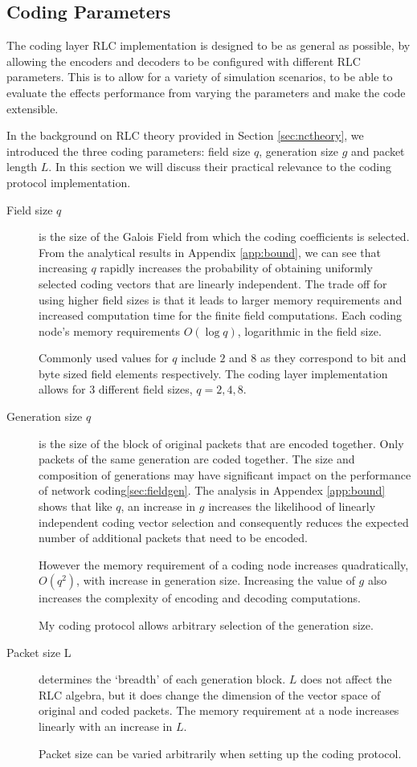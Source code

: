 \documentclass[12pt,a4paper,twoside,openright]{report}
\begin{document}
\subsection{Coding Parameters}


The coding layer RLC implementation is designed to be as general as possible, by allowing the encoders and decoders to be configured with different RLC parameters. This is to allow for a variety of simulation scenarios, to be able to evaluate the effects performance from varying the parameters and make the code extensible.

In the background on RLC theory provided in Section \ref{sec:nctheory}, we introduced the three coding parameters: field size $q$, generation size $g$ and packet length $L$. In this section we will discuss their practical relevance to the coding protocol implementation.

\begin{description}
	\item[Field size $q$] is the size of the Galois Field from which the coding coefficients is selected. From the analytical results in Appendix \ref{app:bound}, we can see that increasing $q$ rapidly increases the probability of obtaining uniformly selected coding vectors that are linearly independent. The trade off for using higher field sizes is that it leads to larger memory requirements and increased computation time for the finite field computations. Each coding node's memory requirements $O(\log q)$, logarithmic in the field size.

	  Commonly used values for $q$ include $2$ and $8$ as they correspond to bit and byte sized field elements respectively. The coding layer implementation allows for $3$ different field sizes, $q = 2, 4, 8$.
	\item[Generation size $q$] is the size of the block of original packets that are encoded together. Only packets of the same generation are coded together. The size and composition of generations may have significant impact on the performance of network coding\ref{sec:fieldgen}. The analysis in Appendex \ref{app:bound} shows that like $q$, an increase in $g$ increases the likelihood of linearly independent coding vector selection and consequently reduces the expected number of additional packets that need to be encoded. 

	However the memory requirement of a coding node increases quadratically, $O(q^2)$, with increase in generation size. Increasing the value of $g$ also increases the complexity of encoding and decoding computations. 

	My coding protocol allows arbitrary selection of the generation size. 
	\item[Packet size L] determines the `breadth' of each generation block. $L$ does not affect the RLC algebra, but it does change the dimension of the vector space of original and coded packets. The memory requirement at a node increases linearly with an increase in $L$.

	Packet size can be varied arbitrarily when setting up the coding protocol.

\end{description}
\end{document}
